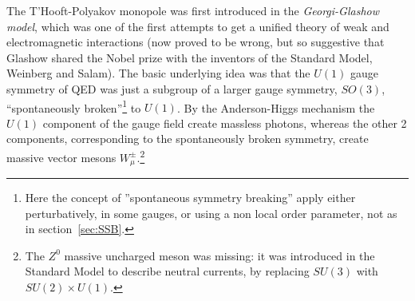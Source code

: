 \documentclass[../main/main.tex]{subfiles}
\begin{document}
The T'Hooft-Polyakov monopole was first introduced in the \emph{Georgi-Glashow model}, which was one of the first attempts to get a unified theory of weak and electromagnetic interactions (now proved to be wrong, but so suggestive that Glashow shared the Nobel prize with the inventors of the Standard Model, Weinberg and Salam). The basic underlying idea was that the $U(1)$ gauge symmetry of QED was just a subgroup of a larger gauge symmetry, $SO(3)$, ``spontaneously broken''\footnote{Here the concept of ''spontaneous symmetry breaking'' apply either perturbatively, in some gauges, or using a non local order parameter, not as in section~\ref{sec:SSB}.} to $U(1)$. By the Anderson-Higgs mechanism the $U(1)$ component of the gauge field create massless photons, whereas the other 2 components, corresponding to the spontaneously broken symmetry, create massive vector mesons $W_\mu^\pm$.\footnote{The $Z^0$ massive uncharged meson was missing: it was introduced in the Standard Model to describe neutral currents, by replacing $SU(3)$ with $SU(2)\times U(1)$.} 






\end{document}
